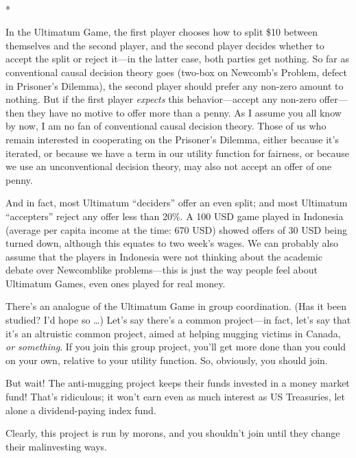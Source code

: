{\centering
 \ ~
\par}

{\centering
 *
\par}


{
 In the Ultimatum Game, the first player chooses how to split \$10
between themselves and the second player, and the second player decides
whether to accept the split or reject it---in the latter case, both
parties get nothing. So far as conventional causal decision theory goes
(two-box on Newcomb's Problem, defect in
Prisoner's Dilemma), the second player should prefer
any non-zero amount to nothing. But if the first player
\textit{expects} this behavior---accept any non-zero offer---then they
have no motive to offer more than a penny. As I assume you all know by
now, I am no fan of conventional causal decision theory. Those of us
who remain interested in cooperating on the Prisoner's
Dilemma, either because it's iterated, or because we
have a term in our utility function for fairness, or because we use an
unconventional decision theory, may also not accept an offer of one
penny. }

{
 And in fact, most Ultimatum
``deciders'' offer an even split;
and most Ultimatum ``accepters''
reject any offer less than 20\%. A 100 USD game played in Indonesia
(average per capita income at the time: 670 USD) showed offers of 30
USD being turned down, although this equates to two
week's wages. We can probably also assume that the
players in Indonesia were not thinking about the academic debate over
Newcomblike problems---this is just the way people feel about Ultimatum
Games, even ones played for real money.}

{
 There's an analogue of the Ultimatum Game in group
coordination. (Has it been studied? I'd hope so \ldots)
Let's say there's a common project---in
fact, let's say that it's an altruistic
common project, aimed at helping mugging victims in Canada, \textit{or
something}. If you join this group project, you'll get
more done than you could on your own, relative to your utility
function. So, obviously, you should join.}

{
 But wait! The anti-mugging project keeps their funds invested in a
money market fund! That's ridiculous; it
won't earn even as much interest as US Treasuries, let
alone a dividend-paying index fund.}

{
 Clearly, this project is run by morons, and you
shouldn't join until they change their malinvesting
ways.}

